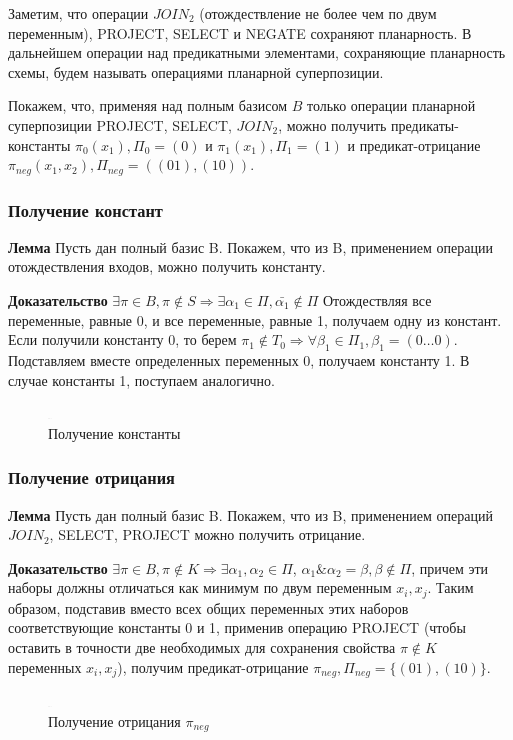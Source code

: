 \documentclass[12pt]{article}
\begin{document}
Заметим, что операции $JOIN_2$ (отождествление не более чем по двум переменным), PROJECT, SELECT и NEGATE 
сохраняют планарность. В дальнейшем операции над предикатными элементами, сохраняющие планарность схемы,
будем называть операциями планарной суперпозиции.

Покажем, что, применяя над полным базисом $B$ только операции планарной суперпозиции PROJECT, SELECT, $JOIN_2$,
можно получить предикаты-константы
$\pi_0(x_1), \Pi_0=(0)$ и $\pi_1(x_1), \Pi_1=(1)$ и предикат-отрицание $\pi_{neg}(x_1, x_2), \Pi_{neg}=( (01), (10) )$.

\subsubsection{Получение констант}
\textbf{Лемма} Пусть дан полный базис B. Покажем, что из B, применением операции отождествления входов,
можно получить константу.

\textbf{Доказательство} $\exists \pi \in B, \pi \notin S \Rightarrow \exists \alpha_1 \in \Pi, \bar{\alpha_1} \notin \Pi$
Отождествляя все переменные, равные 0, и все переменные, равные 1, получаем одну из констант.
Если получили константу 0, то берем $\pi_1 \notin T_0 \Rightarrow \forall \beta_1 \in \Pi_1, \beta_1=(0 \ldots 0)$. 
Подставляем вместе определенных переменных 0, получаем константу 1. 
В случае константы 1, поступаем аналогично.
\begin{figure}[htb]
\centering
\includegraphics[width=0.01\textwidth]{3_2to3.png}
\caption{Получение константы}
\label{fig:constant}
\end{figure}

\subsubsection{Получение отрицания}
\textbf{Лемма}
Пусть дан полный базис B. Покажем, что из B, применением операций $JOIN_2$, SELECT, PROJECT можно получить отрицание.

\textbf{Доказательство} $\exists \pi \in B, \pi \notin K \Rightarrow \exists \alpha_1, \alpha_2 \in \Pi$,
$\alpha_1\&\alpha_2=\beta, \beta \notin \Pi$, причем эти наборы должны отличаться как минимум по двум переменным $x_i, x_{j}$.
Таким образом, подставив вместо всех общих переменных этих наборов соответствующие константы 0 и 1, применив операцию PROJECT
(чтобы оставить в точности две необходимых для сохранения свойства $\pi \notin K$ переменных $x_i, x_j$), 
получим предикат-отрицание $\pi_{neg}, \Pi_{neg} = \{ (01), (10) \} $.
\begin{figure}[htb]
\centering
\includegraphics[width=0.01\textwidth]{3_2to3.png}
\caption{Получение отрицания $\pi_{neg}$}
\label{fig:negation}
\end{figure}
\end{document}
